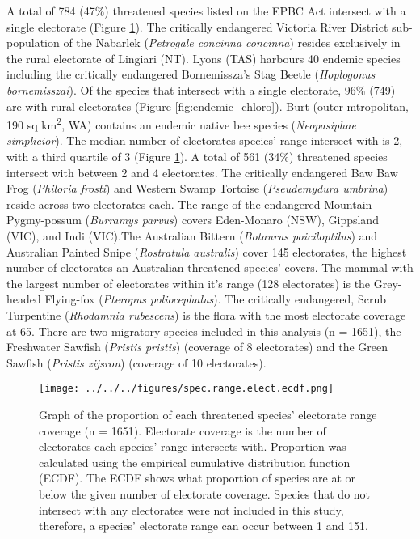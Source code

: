 \documentclass[a4paper,11pt]{article}
\begin{document}
A total of 784 (47\%) threatened species listed on the EPBC Act intersect with a single electorate (Figure \ref{fig:hist}). The critically endangered Victoria River District sub-population of the Nabarlek (\emph{Petrogale concinna concinna}) resides exclusively in the rural electorate of Lingiari (NT). Lyons (TAS) harbours 40 endemic species including the critically endangered Bornemissza's Stag Beetle (\emph{Hoplogonus bornemisszai}). Of the species that intersect with a single electorate, 96\% (749) are with rural electorates (Figure \ref{fig:endemic_chloro}). Burt (outer mtropolitan, 190 sq km\textsuperscript{2}, WA) contains an endemic native bee species (\emph{Neopasiphae simplicior}). The median number of electorates species' range intersect with is 2, with a third quartile of 3 (Figure \ref{fig:hist}). A total of 561 (34\%) threatened species intersect with between 2 and 4 electorates. The critically endangered Baw Baw Frog (\emph{Philoria frosti}) and Western Swamp Tortoise (\emph{Pseudemydura umbrina}) reside across two electorates each. The range of the endangered Mountain Pygmy-possum (\emph{Burramys parvus}) covers Eden-Monaro (NSW), Gippsland (VIC), and Indi (VIC).The Australian Bittern (\emph{Botaurus poiciloptilus}) and Australian Painted Snipe (\emph{Rostratula australis}) cover 145 electorates, the highest number of electorates an Australian threatened species' covers. The mammal with the largest number of electorates within it's range (128 electorates) is the Grey-headed Flying-fox (\emph{Pteropus poliocephalus}). The critically endangered, Scrub Turpentine (\emph{Rhodamnia rubescens}) is the flora with the most electorate coverage at 65. There are two migratory species included in this analysis (n = 1651), the Freshwater Sawfish (\emph{Pristis pristis}) (coverage of 8 electorates) and the Green Sawfish (\emph{Pristis zijsron}) (coverage of 10 electorates).

\begin{figure}[H]
	\centering
    \texttt{[image: ../../../figures/spec.range.elect.ecdf.png]}
    \caption{Graph of the proportion of each threatened species' electorate range coverage (n = 1651). Electorate coverage is the number of electorates each species' range intersects with. Proportion was calculated using the empirical cumulative distribution function (ECDF). The ECDF shows what proportion of species are at or below the given number of electorate coverage. Species that do not intersect with any electorates were not included in this study, therefore, a species' electorate range can occur between 1 and 151.}
    \label{fig:hist}
\end{figure}
\end{document}
